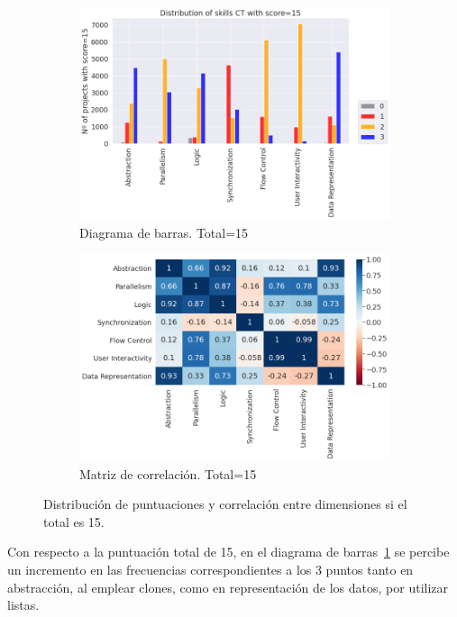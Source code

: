 \documentclass[a4paper, 12pt]{book}
\begin{document}
\begin{figure}[H]
    \centering
    \begin{subfigure}[h]{.49\textwidth} 
        \includegraphics[width=\textwidth]{img/distribucion_15_Scratch}
        \caption{Diagrama de barras. Total=15}
        \label{fig:total15}
    \end{subfigure}       
    \begin{subfigure}[h]{.49\textwidth} 
        \includegraphics[width=\textwidth]{img/corr_15_Scratch}
        \caption{Matriz de correlación. Total=15}
        \label{fig:corr15}
    \end{subfigure}
     \caption{Distribución de puntuaciones y correlación entre dimensiones si el total es 15.}
\end{figure}

Con respecto a la puntuación total de 15, en el diagrama de barras~\ref{fig:total15} se percibe un incremento en las frecuencias correspondientes a los 3 puntos tanto en abstracción, al emplear clones, como en representación de los datos, por utilizar listas.
\end{document}
